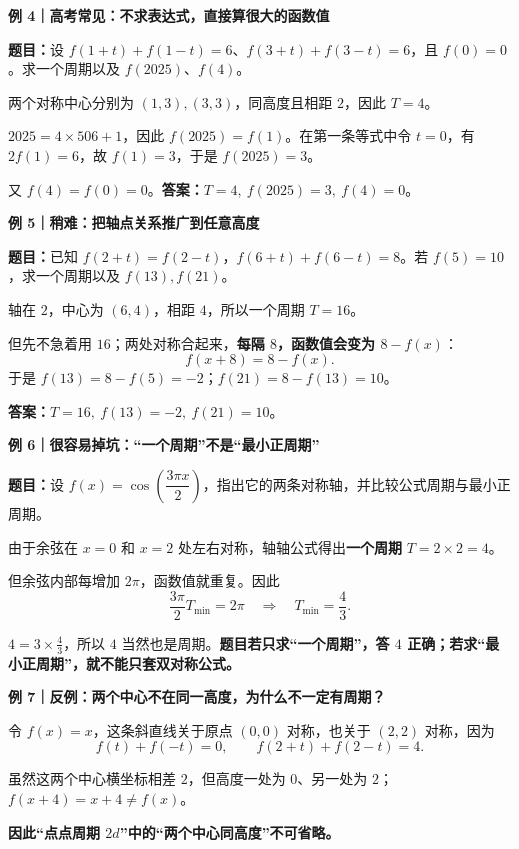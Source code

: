 \clearpage
\begin{examplebox}
\textbf{\textcolor{CExample}{例 4｜高考常见：不求表达式，直接算很大的函数值}}



\textbf{题目：}设 $f(1+t)+f(1-t)=6$、$f(3+t)+f(3-t)=6$，且 $f(0)=0$。求一个周期以及 $f(2025)$、$f(4)$。

两个对称中心分别为 $(1,3),(3,3)$，同高度且相距 $2$，因此 $T=4$。

$2025=4\times506+1$，因此 $f(2025)=f(1)$。在第一条等式中令 $t=0$，有 $2f(1)=6$，故 $f(1)=3$，于是 $f(2025)=3$。

又 $f(4)=f(0)=0$。\textbf{答案：}$\boxed{T=4,\ f(2025)=3,\ f(4)=0}$。

\medskip

\end{examplebox}
\clearpage
\begin{examplebox}
\textbf{\textcolor{CExample}{例 5｜稍难：把轴点关系推广到任意高度}}



\textbf{题目：}已知 $f(2+t)=f(2-t)$，$f(6+t)+f(6-t)=8$。若 $f(5)=10$，求一个周期以及 $f(13),f(21)$。

轴在 $2$，中心为 $(6,4)$，相距 $4$，所以一个周期 $T=16$。

但先不急着用 $16$；两处对称合起来，\textbf{每隔 $8$，函数值会变为 $8-f(x)$}：
\[
 f(x+8)=8-f(x).
\]
于是 $f(13)=8-f(5)= -2$；$f(21)=8-f(13)=10$。

\textbf{答案：}$\boxed{T=16,\ f(13)=-2,\ f(21)=10}$。

\medskip

\end{examplebox}
\clearpage
\begin{examplebox}
\textbf{\textcolor{CExample}{例 6｜很容易掉坑：“一个周期”不是“最小正周期”}}



\textbf{题目：}设 $f(x)=\cos\!\left(\dfrac{3\pi x}{2}\right)$，指出它的两条对称轴，并比较公式周期与最小正周期。

由于余弦在 $x=0$ 和 $x=2$ 处左右对称，轴轴公式得出\textbf{一个周期} $T=2\times2=4$。

但余弦内部每增加 $2\pi$，函数值就重复。因此
\[
\frac{3\pi}{2}T_{\min}=2\pi
\quad\Longrightarrow\quad T_{\min}=\frac43.
\]

$4=3\times\frac43$，所以 $4$ 当然也是周期。\textbf{题目若只求“一个周期”，答 $4$ 正确；若求“最小正周期”，就不能只套双对称公式。}

\medskip

\end{examplebox}
\clearpage
\begin{examplebox}
\textbf{\textcolor{CExample}{例 7｜反例：两个中心不在同一高度，为什么不一定有周期？}}



令 $f(x)=x$，这条斜直线关于原点 $(0,0)$ 对称，也关于 $(2,2)$ 对称，因为
\[
 f(t)+f(-t)=0,\qquad f(2+t)+f(2-t)=4.
\]

虽然这两个中心横坐标相差 $2$，但高度一处为 $0$、另一处为 $2$；$f(x+4)=x+4\ne f(x)$。

\textbf{因此“点点周期 $2d$”中的“两个中心同高度”不可省略。}
\end{examplebox}
